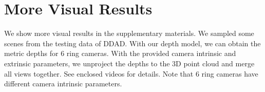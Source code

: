 \documentclass[10pt,onecolumn,letterpaper]{article}
\begin{document}
\section{More Visual Results}
We show more visual results in the supplementary materials. We sampled some scenes from the testing data of DDAD. With our depth model, we can obtain the metric depths for 6 ring cameras. With the provided camera intrinsic and extrinsic parameters, we unproject the depths to the 3D point cloud and merge all views together. See enclosed videos for details. Note that 6 ring cameras have different camera intrinsic parameters. 



\maketitle

\def\PWN{{\rm PWN}}
\def\VNL{{\rm VNL}}
\def\RPNL{{\rm RPNL}}









{\small


}
\end{document}
